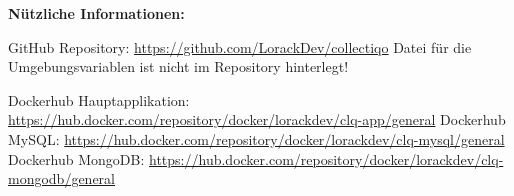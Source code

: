 \textbf{Nützliche Informationen:}

GitHub Repository: \url{https://github.com/LorackDev/collectiqo}
Datei für die Umgebungsvariablen ist nicht im Repository hinterlegt!

Dockerhub Hauptapplikation: \url{https://hub.docker.com/repository/docker/lorackdev/clq-app/general}
Dockerhub MySQL: \url{https://hub.docker.com/repository/docker/lorackdev/clq-mysql/general}
Dockerhub MongoDB: \url{https://hub.docker.com/repository/docker/lorackdev/clq-mongodb/general}